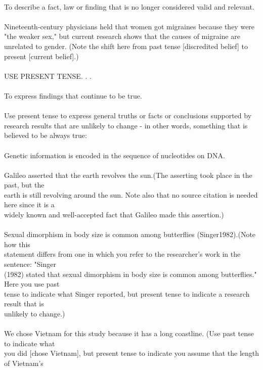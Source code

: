 \\
To describe a fact, law or finding that is no longer considered valid and relevant.\\
\\
Nineteenth-century physicians held that women got migraines because they were "the weaker sex," but current research shows that the causes of migraine are unrelated to gender. (Note the shift here from past tense [discredited belief] to present [current belief].)\\
\\
USE PRESENT TENSE. . .\\
\\
To express findings that continue to be true.\\
\\
Use present tense to express general truths or facts or conclusions supported by research results that are unlikely to change - in other words, something that is believed to be always true:\\
\\
       Genetic information is encoded in the sequence of nucleotides on DNA.\\
\\
       Galileo asserted that the earth revolves the sun.(The asserting took place in the past, but the\\
       earth is still revolving around the sun. Note also that no source citation is needed here since it is a\\
       widely known and well-accepted fact that Galileo made this assertion.)\\
\\
       Sexual dimorphism in body size is common among butterflies  (Singer1982).(Note how this\\
       statement differs from one in which you refer to the researcher's work in the sentence: "Singer\\
       (1982) stated that sexual dimorphism in body size is common among butterflies." Here you use past\\
       tense to indicate what Singer reported, but present tense to indicate a research result that is\\
       unlikely to change.)\\
\\
       We chose Vietnam for this study because it has a long coastline. (Use past tense to indicate what\\
       you did [chose Vietnam], but present tense to indicate you assume that the length of Vietnam's\\

